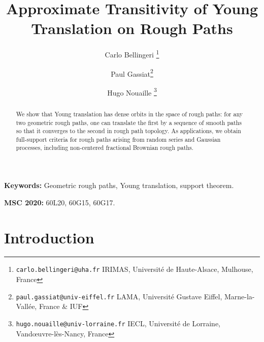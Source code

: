 \documentclass[12pt,a4paper]{article}
\title{Approximate Transitivity of Young Translation on Rough Paths}
\date{}
\author{Carlo Bellingeri  \thanks{ \texttt{carlo.bellingeri@uha.fr}  IRIMAS, Université de Haute-Alsace, Mulhouse, France}\and Paul Gassiat\thanks{\texttt{paul.gassiat@univ-eiffel.fr} LAMA, Université Gustave Eiffel, Marne-la-Vallée, France \& IUF}%
\and Hugo Nouaille \thanks{\texttt{hugo.nouaille@univ-lorraine.fr}  IECL, Université de Lorraine, Vandœuvre-lès-Nancy, France}
}
\numberwithin{equation}{section}
\theoremstyle{plain}
\theoremstyle{definition}
\theoremstyle{remark}
\begin{document}
 \medskip
 
 \maketitle
 
 \begin{abstract}
\noindent We show that Young translation has dense orbits in the space of rough paths: for any two geometric rough paths, one can translate the first by a sequence of smooth paths so that it converges to the second in rough path topology. As applications, we obtain full-support criteria for rough paths arising from random series and Gaussian processes, including non-centered fractional Brownian rough paths.
\end{abstract}

 \textbf{Keywords:} Geometric rough paths, Young translation, support theorem.

\medskip

\textbf{MSC 2020:} 	60L20, 	60G15, 	60G17.


\section{Introduction}
%
%
%
\end{document}
